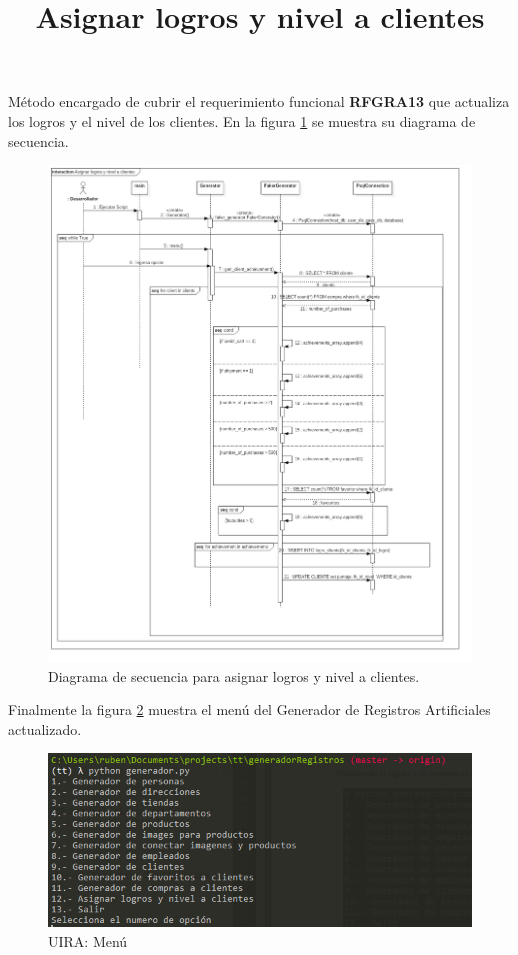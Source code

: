 \title{\textbf{Asignar logros y nivel a clientes\\}}
Método encargado de cubrir el requerimiento funcional \textbf{RFGRA13} que actualiza los logros y el nivel de los clientes. En la figura \ref{image:DSnivel} se muestra su diagrama de secuencia. 
\FloatBarrier
\begin{figure}[htbp!]
		\centering
			\includegraphics[width=1 \textwidth]{imagenes/DSRuben/gen_client_achievement}
		\caption{Diagrama de secuencia para asignar logros y nivel a clientes.}
		\label{image:DSnivel}
\end{figure}
\FloatBarrier

Finalmente la figura \ref{RA:11} muestra el menú del Generador de Registros Artificiales actualizado.

\FloatBarrier
\begin{figure}[htbp!]
		\centering
			\includegraphics[width=.9 \textwidth]{imagenes/registrosArt/Menu11}
		\caption{UIRA: Menú}
		\label{RA:11}
\end{figure}
\FloatBarrier 